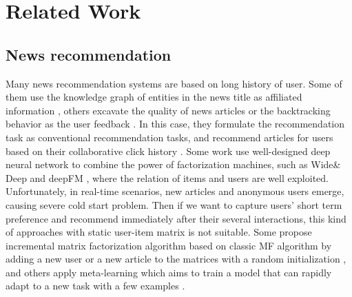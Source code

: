 \section{Related Work}
\subsection{News recommendation}
Many news recommendation systems \cite{wu_neural_2019-1, wu2019npa} are based on long history of user. Some of them use the knowledge graph of entities in the news title as affiliated information \cite{wang2018dkn, wang_ripplenet:_2018}, others excavate the quality of news articles \cite{lu_quality_2019} or the backtracking behavior as the user feedback \cite{smadja_understanding_2019}. In this case, they formulate the recommendation task as conventional recommendation tasks, and recommend articles for users based on their collaborative click history \cite{zhu2019dan}. Some work use well-designed deep neural network to combine the power of factorization machines, such as Wide\& Deep \cite{cheng2016wide} and deepFM \cite{guodeepfm2017}, where the relation of items and users are well exploited. Unfortunately, in real-time scenarios, new articles and anonymous users emerge, causing severe cold start problem. Then if we want to capture users' short term preference and recommend immediately after their several interactions, this kind of approaches with static user-item matrix is not suitable. Some propose incremental matrix factorization algorithm based on classic MF algorithm by adding a new user or a new article to the matrices with a random initialization \cite{al2018adaptive}, and others apply meta-learning which aims to train a model that can rapidly adapt to a new task with a few examples \cite{lee_melu:_2019}. 
